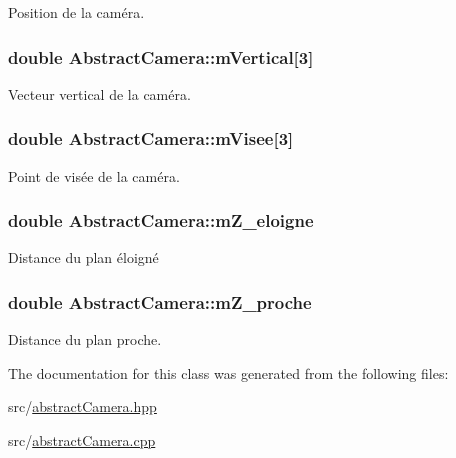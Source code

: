 Position de la caméra. 

\subsubsection[{\texorpdfstring{m\+Vertical}{mVertical}}]{\setlength{\rightskip}{0pt plus 5cm}double Abstract\+Camera\+::m\+Vertical\mbox{[}3\mbox{]}\hspace{0.3cm}{\ttfamily [protected]}}\hypertarget{class_abstract_camera_a64675d12169d6383a9371d7fd710a441}{}\label{class_abstract_camera_a64675d12169d6383a9371d7fd710a441}


Vecteur vertical de la caméra. 

\subsubsection[{\texorpdfstring{m\+Visee}{mVisee}}]{\setlength{\rightskip}{0pt plus 5cm}double Abstract\+Camera\+::m\+Visee\mbox{[}3\mbox{]}\hspace{0.3cm}{\ttfamily [protected]}}\hypertarget{class_abstract_camera_a5c7db642de2add50fad69539a8b220d8}{}\label{class_abstract_camera_a5c7db642de2add50fad69539a8b220d8}


Point de visée de la caméra. 

\subsubsection[{\texorpdfstring{m\+Z\+\_\+eloigne}{mZ_eloigne}}]{\setlength{\rightskip}{0pt plus 5cm}double Abstract\+Camera\+::m\+Z\+\_\+eloigne\hspace{0.3cm}{\ttfamily [protected]}}\hypertarget{class_abstract_camera_a8e076553a55c8e2f19948bdf4ea01be1}{}\label{class_abstract_camera_a8e076553a55c8e2f19948bdf4ea01be1}


Distance du plan éloigné 

\subsubsection[{\texorpdfstring{m\+Z\+\_\+proche}{mZ_proche}}]{\setlength{\rightskip}{0pt plus 5cm}double Abstract\+Camera\+::m\+Z\+\_\+proche\hspace{0.3cm}{\ttfamily [protected]}}\hypertarget{class_abstract_camera_a408e219c2aed42b6aa4f9198c252d10a}{}\label{class_abstract_camera_a408e219c2aed42b6aa4f9198c252d10a}


Distance du plan proche. 



The documentation for this class was generated from the following files\+:\begin{DoxyCompactItemize}
\item 
src/\hyperlink{abstract_camera_8hpp}{abstract\+Camera.\+hpp}\item 
src/\hyperlink{abstract_camera_8cpp}{abstract\+Camera.\+cpp}\end{DoxyCompactItemize}
